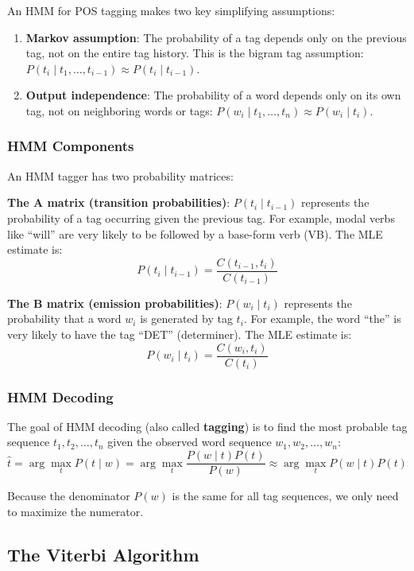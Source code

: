 \documentclass[11pt,a4paper]{article}
\begin{document}
An HMM for POS tagging makes two key simplifying assumptions:
\begin{enumerate}
    \item \textbf{Markov assumption}: The probability of a tag depends only on the previous tag, not on the entire tag history. This is the bigram tag assumption: $P(t_i \mid t_1, \ldots, t_{i-1}) \approx P(t_i \mid t_{i-1})$.
    \item \textbf{Output independence}: The probability of a word depends only on its own tag, not on neighboring words or tags: $P(w_i \mid t_1, \ldots, t_n) \approx P(w_i \mid t_i)$.
\end{enumerate}

\subsubsection{HMM Components}

An HMM tagger has two probability matrices:

\textbf{The A matrix (transition probabilities)}: $P(t_i \mid t_{i-1})$ represents the probability of a tag occurring given the previous tag. For example, modal verbs like ``will'' are very likely to be followed by a base-form verb (VB). The MLE estimate is:
\[
P(t_i \mid t_{i-1}) = \frac{C(t_{i-1}, t_i)}{C(t_{i-1})}
\]

\textbf{The B matrix (emission probabilities)}: $P(w_i \mid t_i)$ represents the probability that a word $w_i$ is generated by tag $t_i$. For example, the word ``the'' is very likely to have the tag ``DET'' (determiner). The MLE estimate is:
\[
P(w_i \mid t_i) = \frac{C(w_i, t_i)}{C(t_i)}
\]

\subsubsection{HMM Decoding}

The goal of HMM decoding (also called \textbf{tagging}) is to find the most probable tag sequence $t_1, t_2, \ldots, t_n$ given the observed word sequence $w_1, w_2, \ldots, w_n$:
\[
\hat{t} = \arg\max_t P(t \mid w) = \arg\max_t \frac{P(w \mid t) P(t)}{P(w)} \approx \arg\max_t P(w \mid t) P(t)
\]

Because the denominator $P(w)$ is the same for all tag sequences, we only need to maximize the numerator.

\subsection{The Viterbi Algorithm}
\end{document}
